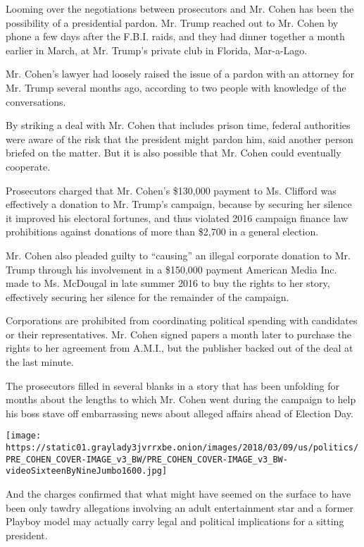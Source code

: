 Looming over the negotiations between prosecutors and Mr. Cohen has been
the possibility of a presidential pardon. Mr. Trump reached out to Mr.
Cohen by phone a few days after the F.B.I. raids, and they had dinner
together a month earlier in March, at Mr. Trump's private club in
Florida, Mar-a-Lago.

Mr. Cohen's lawyer had loosely raised the issue of a pardon with an
attorney for Mr. Trump several months ago, according to two people with
knowledge of the conversations.

By striking a deal with Mr. Cohen that includes prison time, federal
authorities were aware of the risk that the president might pardon him,
said another person briefed on the matter. But it is also possible that
Mr. Cohen could eventually cooperate.

Prosecutors charged that Mr. Cohen's \$130,000 payment to Ms. Clifford
was effectively a donation to Mr. Trump's campaign, because by securing
her silence it improved his electoral fortunes, and thus violated 2016
campaign finance law prohibitions against donations of more than \$2,700
in a general election.

Mr. Cohen also pleaded guilty to ``causing'' an illegal corporate
donation to Mr. Trump through his involvement in a \$150,000 payment
American Media Inc. made to Ms. McDougal in late summer 2016 to buy the
rights to her story, effectively securing her silence for the remainder
of the campaign.

Corporations are prohibited from coordinating political spending with
candidates or their representatives. Mr. Cohen signed papers a month
later to purchase the rights to her agreement from A.M.I., but the
publisher backed out of the deal at the last minute.

The prosecutors filled in several blanks in a story that has been
unfolding for months about the lengths to which Mr. Cohen went during
the campaign to help his boss stave off embarrassing news about alleged
affairs ahead of Election Day.

\texttt{[image: https://static01.graylady3jvrrxbe.onion/images/2018/03/09/us/politics/PRE\_COHEN\_COVER-IMAGE\_v3\_BW/PRE\_COHEN\_COVER-IMAGE\_v3\_BW-videoSixteenByNineJumbo1600.jpg]}

And the charges confirmed that what might have seemed on the surface to
have been only tawdry allegations involving an adult entertainment star
and a former Playboy model may actually carry legal and political
implications for a sitting president.

